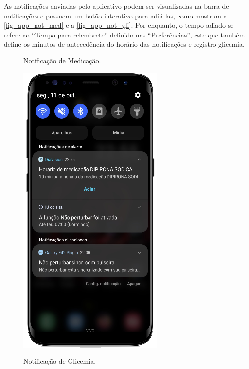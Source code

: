 As notificações enviadas pelo aplicativo podem ser visualizadas na barra de notificações e possuem um botão
interativo para adiá-las, como mostram a \autoref{fig_app_not_med} e a \autoref{fig_app_not_gli}. Por enquanto,
o tempo adiado se refere ao ``Tempo para relembrete'' definido nas “Preferências”, este que também define
os minutos de antecedência do horário das notificações e registro glicemia.

\begin{figure}[htb]
    \centering
    \begin{minipage}{0.4\textwidth}
        \centering
        \caption{Notificação de Medicação.}\label{fig_app_not_med}
        \includegraphics[scale=0.64]{Imagens/desenvolvimento/app/app_not_med.png}
    \end{minipage}
    \hfill
    \begin{minipage}{0.58\textwidth}
        \centering
        \caption{Notificação de Glicemia.}\label{fig_app_not_gli}

\end{minipage}
\end{figure}
